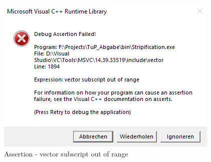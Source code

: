 \begin{figure}[ht]
    \centering
    \includegraphics[scale = 0.75]{images/Error.PNG}
    \caption{Assertion - vector subscript out of range}
	\label{fig:Error}
\end{figure} 